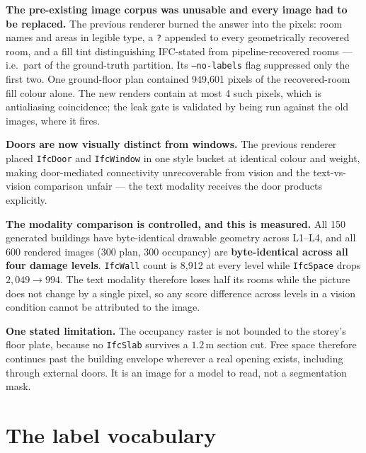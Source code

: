 \documentclass[11pt,a4paper]{article}
\newcommand{\code}[1]{\texttt{\small #1}}
\begin{document}
\noindent
\textbf{The pre-existing image corpus was unusable and every image had to be
replaced.} The previous renderer burned the answer into the pixels: room names
and areas in legible type, a \code{?} appended to every geometrically recovered
room, and a fill tint distinguishing IFC-stated from pipeline-recovered rooms
--- i.e.\ part of the ground-truth partition. Its \code{--no-labels} flag
suppressed only the first two. One ground-floor plan contained 949{,}601 pixels
of the recovered-room fill colour alone. The new renders contain at most 4 such
pixels, which is antialiasing coincidence; the leak gate is validated by being
run against the old images, where it fires.

\noindent
\textbf{Doors are now visually distinct from windows.} The previous renderer
placed \code{IfcDoor} and \code{IfcWindow} in one style bucket at identical
colour and weight, making door-mediated connectivity unrecoverable from vision
and the text-vs-vision comparison unfair --- the text modality receives the door
products explicitly.

\noindent
\textbf{The modality comparison is controlled, and this is measured.} All 150
generated buildings have byte-identical drawable geometry across L1--L4, and all
600 rendered images (300 plan, 300 occupancy) are \textbf{byte-identical across
all four damage levels}. \code{IfcWall} count is 8{,}912 at every level while
\code{IfcSpace} drops $2{,}049\to994$. The text modality therefore loses half
its rooms while the picture does not change by a single pixel, so any score
difference across levels in a vision condition cannot be attributed to the
image.

\noindent
\textbf{One stated limitation.} The occupancy raster is not bounded to the
storey's floor plate, because no \code{IfcSlab} survives a $1.2$\,m section cut.
Free space therefore continues past the building envelope wherever a real
opening exists, including through external doors. It is an image for a model to
read, not a segmentation mask.

\section{The label vocabulary}
\end{document}
